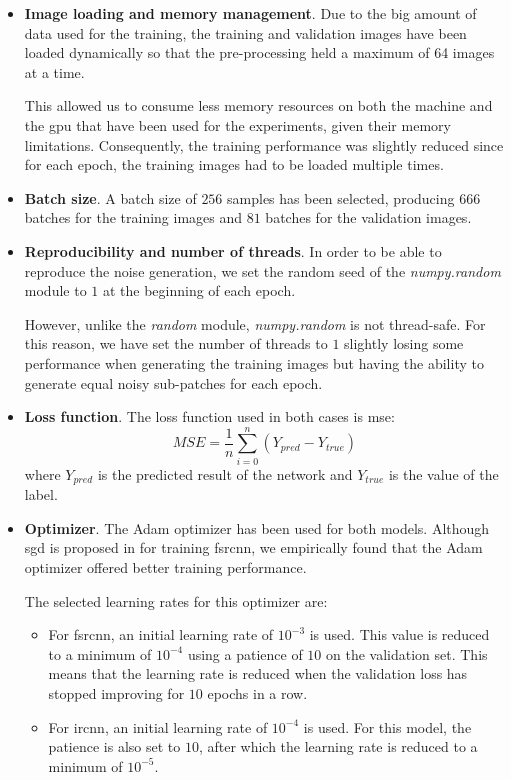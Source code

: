\begin{itemize}
	\item \textbf{Image loading and memory management}. Due to the big amount of data used for the training, the training and validation images have been loaded dynamically so that the pre-processing held a maximum of 64 images at a time. 
	
	This allowed us to consume less memory resources on both the machine and the \gls{gpu} that have been used for the experiments, given their memory limitations. Consequently, the training performance was slightly reduced since for each epoch, the training images had to be loaded multiple times.
	
	\item \textbf{Batch size}. A batch size of $256$ samples has been selected, producing $666$ batches for the training images and $81$ batches for the validation images.
	
	\item \textbf{Reproducibility and number of threads}. In order to be able to reproduce the noise generation, we set the random seed of the \textit{numpy.random} module to $1$ at the beginning of each epoch. 
	
	However, unlike the \textit{random} module, \textit{numpy.random} is not thread-safe. For this reason, we have set the number of threads to $1$ slightly losing some performance when generating the training images but having the ability to generate equal noisy sub-patches for each epoch.
	
	\item \textbf{Loss function}. The loss function used in both cases is \gls{mse}:
	$$MSE = \frac{1}{n}\sum_{i=0}^{n}\left(Y_{pred}-Y_{true}\right)$$
	where $Y_{pred}$ is the predicted result of the network and $Y_{true}$ is the value of the label.
	\item \textbf{Optimizer}. The Adam optimizer \cite{ADAM} has been used for both models. Although \gls{sgd} is proposed in \cite{FSRCNN} for training \gls{fsrcnn}, we empirically found that the Adam optimizer offered better training performance.
	
	The selected learning rates for this optimizer are:
	\begin{itemize}
		\item For \gls{fsrcnn}, an initial learning rate of $10^{-3}$ is used. This value is reduced to a minimum of $10^{-4}$ using a patience of $10$ on the validation set. This means that the learning rate is reduced when the validation loss has stopped improving for $10$ epochs in a row.
		\item For \gls{ircnn}, an initial learning rate of $10^{-4}$ is used. For this model, the patience is also set to $10$, after which the learning rate is reduced to a minimum of $10^{-5}$. 
		

\end{itemize}
\end{itemize}

